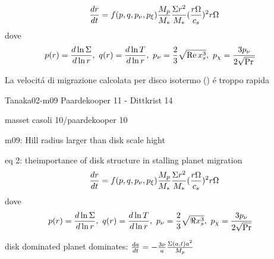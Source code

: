 
\begin{workout}
\begin{equation}
\TDy{t}{r}=f(p,q,p_{\nu},p_{\xi})\frac{M_p}{M_*}\frac{\Sigma r^2}{M_*}(\frac{r\Omega}{c_s})^2r\Omega
\end{equation}
dove
\begin{align}
&p(r)=\TDly{r}{\Sigma},\ q(r)=\TDly{r}{T},\ p_{\nu}=\frac{2}{3}\sqrt{\Rey{} x_s^3},\ p_{\chi}=\frac{3p_{\nu}}{2\sqrt{\Pra{}}}
\end{align}
\end{workout}

\begin{workout}
La velocit\'a di migrazione calcolata per disco isotermo (\cite{tanaka2002}) \'e troppo rapida
\end{workout}

\begin{workout}
Tanaka02-m09
Paardekooper 11 - Dittkrist 14
\end{workout}

\begin{workout}
masset casoli 10/paardekooper 10
\end{workout}

\begin{workout}
m09: Hill radius larger than disk scale hight
\end{workout}

\begin{workout}
eq 2: theimportance of disk structure in stalling planet migration
\begin{equation}
\TDy{t}{r}=f(p,q,p_{\nu},p_{\xi})\frac{M_p}{M_*}\frac{\Sigma r^2}{M_*}(\frac{r\Omega}{c_s})^2r\Omega
\end{equation}
dove
\begin{align}
&p(r)=\TDly{r}{\Sigma},\ q(r)=\TDly{r}{T},\ p_{\nu}=\frac{2}{3}\sqrt{\Re x_s^3},\ p_{\chi}=\frac{3p_{\nu}}{2\sqrt{\Pr}}
\end{align}
\end{workout}

\begin{workout}
disk dominated
planet dominates: $\TDy{t}{a}=-\frac{3\nu}{a}\frac{\Sigma(a,t)a^2}{M_p}$
\end{workout}

